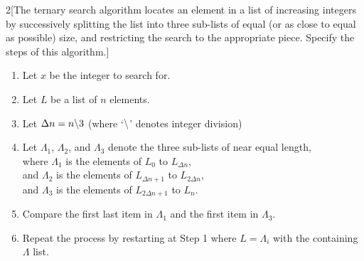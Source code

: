\documentclass{homework}
\begin{document}

\begin{problem}{2}[The ternary search algorithm locates an element in a list of increasing integers by successively splitting the list into three sub-lists of equal (or as close to equal as possible) size, and restricting the search to the appropriate piece. Specify the steps of this algorithm.]

\begin{enumerate}[(1)]

\item Let $x$ be the integer to search for.

\item Let $L$ be a list of $n$ elements.

\item Let $\Delta n = n \char`\\ 3$ (where `$\char`\\$' denotes integer division)

\item Let $\Lambda_1$, $\Lambda_2$, and $\Lambda_3$ denote the three sub-lists of near equal length, \\
where $\Lambda_1$ is the elements of $L_0$ to $L_{\Delta n}$, \\
and $\Lambda_2$ is the elements of $L_{\Delta n + 1}$ to $L_{2 \Delta n}$, \\
and $\Lambda_3$ is the elements of $L_{2 \Delta n + 1}$ to $L_{n}$. \\

\item Compare the first last item in $\Lambda_1$ and the first item in $\Lambda_3$.

\item Repeat the process by restarting at Step 1 where $L = \Lambda_i$ with the containing $\Lambda$ list.
\end{enumerate}

\end{problem}

\end{document}
